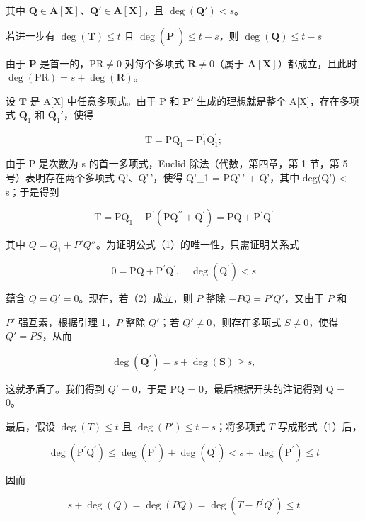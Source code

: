 其中 \(\mathbf{Q} \in \mathbf{A}[\mathbf{X}]\)、\(\mathbf{Q}' \in \mathbf{A}[\mathbf{X}]\)，且 \(\deg(\mathbf{Q}') < s\)。

若进一步有 \(\deg (\mathbf{T})\leqslant t\) 且 \(\deg (\mathbf{P}^{\prime})\leqslant t - s\)，则 \(\deg (\mathbf{Q})\leqslant t - s\)

由于 \(\mathbf{P}\) 是首一的，\(\mathrm{PR} \neq 0\) 对每个多项式 \(\mathbf{R} \neq 0\)（属于 \(\mathbf{A}[\mathbf{X}]\)）都成立，且此时 \(\deg(\mathrm{PR}) = s + \deg(\mathbf{R})\)。

设 \(\mathbf{T}\) 是 A{[}X{]} 中任意多项式。由于 P 和 \(\mathbf{P}'\) 生成的理想就是整个 A{[}X{]}，存在多项式 \(\mathbf{Q}_1\) 和 \(\mathbf{Q}_1'\)，使得

\[
\mathrm{T} = \mathrm{PQ} _ {1} + \mathrm{P} _ {1} ^ {\prime} \mathrm{Q} _ {1} ^ {\prime};
\]

由于 P 是次数为 s 的首一多项式，Euclid 除法（代数，第四章，第 1 节，第 5 号）表明存在两个多项式 Q'、Q'\,'，使得 Q'\_1 = PQ'\,' + Q'，其中 deg(Q') \textless{} s；于是得到

\[
\mathrm{T} = \mathrm{PQ} _ {1} + \mathrm{P} ^ {\prime} (\mathrm{PQ} ^ {\prime \prime} + \mathrm{Q} ^ {\prime}) = \mathrm{PQ} + \mathrm{P} ^ {\prime} \mathrm{Q} ^ {\prime}
\]

其中 \(Q = Q_{1} + P'Q''\)。为证明公式（1）的唯一性，只需证明关系式

\[
0 = \mathrm{PQ} + \mathrm{P} ^ {\prime} \mathrm{Q} ^ {\prime}, \quad \deg (\mathrm{Q} ^ {\prime}) <   s\tag{2}
\]

蕴含 \(Q = Q' = 0\)。现在，若（2）成立，则 \(P\) 整除 \(-PQ = P'Q'\)，又由于 \(P\) 和

\(P'\) 强互素，根据引理 1，\(P\) 整除 \(Q'\)；若 \(Q' \neq 0\)，则存在多项式 \(S \neq 0\)，使得 \(Q' = PS\)，从而

\[
\deg (\mathbf {Q} ^ {\prime}) = s + \deg (\mathbf {S}) \geqslant s,
\]

这就矛盾了。我们得到 \(Q' = 0\)，于是 PQ = 0，最后根据开头的注记得到 Q = 0。

最后，假设 \(\deg(T) \leqslant t\) 且 \(\deg(P') \leqslant t - s\)；将多项式 \(T\) 写成形式（1）后，

\[
\deg (\mathrm{P} ^ {\prime} \mathrm{Q} ^ {\prime}) \leqslant \deg (\mathrm{P} ^ {\prime}) + \deg (\mathrm{Q} ^ {\prime}) <   s + \deg (\mathrm{P} ^ {\prime}) \leqslant t
\]

因而

\[
s + \deg (Q) = \deg (P Q) = \deg (T - P ^ {\prime} Q ^ {\prime}) \leqslant t
\]

